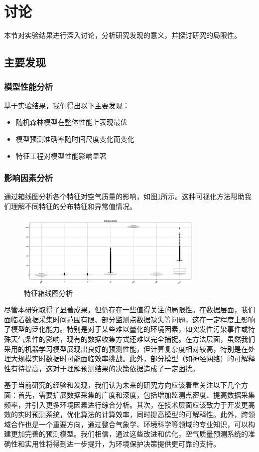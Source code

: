 \section{讨论}

本节对实验结果进行深入讨论，分析研究发现的意义，并探讨研究的局限性。

\subsection{主要发现}
\subsubsection{模型性能分析}
基于实验结果，我们得出以下主要发现：
\begin{itemize}
    \item 随机森林模型在整体性能上表现最优
    \item 模型预测准确率随时间尺度变化而变化
    \item 特征工程对模型性能影响显著
\end{itemize}

\subsubsection{影响因素分析}
通过箱线图分析各个特征对空气质量的影响，如图\ref{fig:feature_box}所示。这种可视化方法帮助我们理解不同特征的分布特征和异常值情况。

\begin{figure}[H]
    \centering
    \includegraphics[width=0.8\textwidth]{images/eda/boxplot}
    \caption{特征箱线图分析}
    \label{fig:feature_box}
\end{figure}

尽管本研究取得了显著成果，但仍存在一些值得关注的局限性。在数据层面，我们面临着数据采集时间范围有限、部分监测点数据缺失等问题，这在一定程度上影响了模型的泛化能力。特别是对于某些难以量化的环境因素，如突发性污染事件或特殊天气条件的影响，现有的数据收集方式还难以完全捕捉。在方法层面，虽然我们采用的机器学习模型展现出良好的预测性能，但计算复杂度相对较高，特别是在处理大规模实时数据时可能面临效率挑战。此外，部分模型（如神经网络）的可解释性有待提高，这对于理解预测结果的决策依据造成了一定困扰。

基于当前研究的经验和发现，我们认为未来的研究方向应该着重关注以下几个方面：首先，需要扩展数据采集的广度和深度，包括增加监测点密度、提高数据采集频率，并引入更多环境因素进行综合分析。其次，在技术层面应该致力于开发更高效的实时预测系统，优化算法的计算效率，同时提高模型的可解释性。此外，跨领域合作也是一个重要方向，通过整合气象学、环境科学等领域的专业知识，可以构建更加完善的预测模型。我们相信，通过这些改进和优化，空气质量预测系统的准确性和实用性将得到进一步提升，为环境保护决策提供更可靠的支持。 